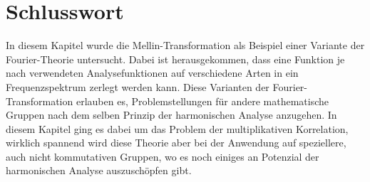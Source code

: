 %
%
%

\section{Schlusswort
\label{mellin:section:teil6}}
In diesem Kapitel wurde die Mellin-Transformation als Beispiel 
einer Variante der Fourier-Theorie untersucht.
Dabei ist herausgekommen, dass eine Funktion je nach verwendeten Analysefunktionen
auf verschiedene Arten in ein Frequenzspektrum zerlegt werden kann. 
Diese Varianten der Fourier-Transformation erlauben es, Problemstellungen 
für andere mathematische Gruppen nach dem selben Prinzip der 
harmonischen Analyse anzugehen.
In diesem Kapitel ging es dabei um das Problem der multiplikativen 
Korrelation, wirklich spannend wird diese Theorie aber bei der Anwendung 
auf speziellere, auch nicht kommutativen Gruppen, wo es noch einiges 
an Potenzial der harmonischen Analyse auszuschöpfen gibt.
